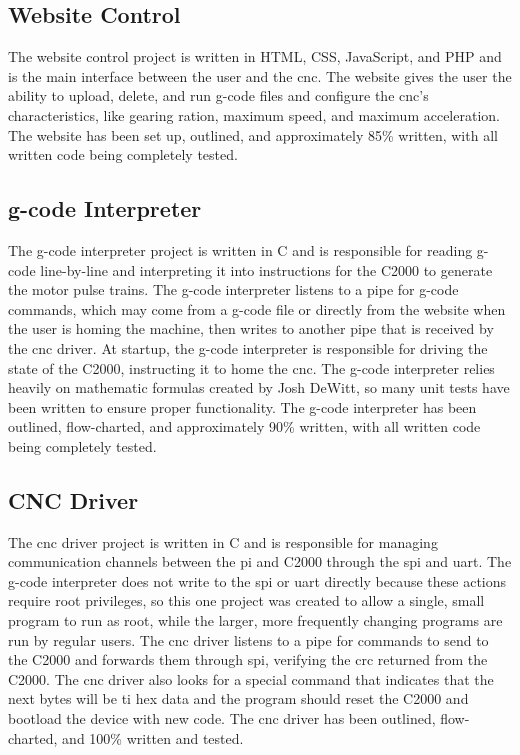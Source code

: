 \subsection{Website Control}
The website control project is written in HTML, CSS, JavaScript, and PHP and is the main interface between the user and the \gls{cnc}.
The website gives the user the ability to upload, delete, and run g-code files and configure the \gls{cnc}'s characteristics, like gearing ration, maximum speed, and maximum acceleration.
The website has been set up, outlined, and approximately 85\% written, with all written code being completely tested.

\subsection{g-code Interpreter}
The g-code interpreter project is written in C and is responsible for reading g-code line-by-line and interpreting it into instructions for the C2000 to generate the motor pulse trains.
The g-code interpreter listens to a pipe for g-code commands, which may come from a g-code file or directly from the website when the user is homing the machine, then writes to another pipe that is received by the \gls{cnc} driver.
At startup, the g-code interpreter is responsible for driving the state of the C2000, instructing it to home the \gls{cnc}.
The g-code interpreter relies heavily on mathematic formulas created by Josh DeWitt, so many unit tests have been written to ensure proper functionality.
The g-code interpreter has been outlined, flow-charted, and approximately 90\% written, with all written code being completely tested.

\subsection{CNC Driver}
The \gls{cnc} driver project is written in C and is responsible for managing communication channels between the \gls{pi} and C2000 through the \gls{spi} and \gls{uart}.
The g-code interpreter does not write to the \gls{spi} or \gls{uart} directly because these actions require root privileges, so this one project was created to allow a single, small program to run as root, while the larger, more frequently changing programs are run by regular users.
The \gls{cnc} driver listens to a pipe for commands to send to the C2000 and forwards them through \gls{spi}, verifying the \gls{crc} returned from the C2000.
The \gls{cnc} driver also looks for a special command that indicates that the next bytes will be \gls{ti} hex data and the program should reset the C2000 and bootload the device with new code.
The \gls{cnc} driver has been outlined, flow-charted, and 100\% written and tested.

